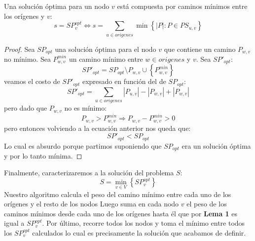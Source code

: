 \begin{lema}
\label{lema_p2}
Una solución óptima para un nodo $v$ está compuesta por caminos mínimos entre los orígenes
y $v$:
\begin{displaymath}
  s = SP_v^{opt} \Leftrightarrow s = \sum_{u \in origenes} \min \left\{ { \left\vert{P}\right\vert : P \in PS_{u, v}} \right\}
\end{displaymath}
\end{lema}
\begin{proof}
  Sea $SP_{opt}$ una solución óptima para el nodo $v$ que contiene un camino $P_{w,v}$ no mínimo. Sea $P_{w,v}^{min}$ 
un camino mínimo entre $w \in origenes$ y $v$. Sea $SP'_{opt}$:
\begin{displaymath}
SP'_{opt} = SP_{opt} \setminus P_{w, v} \cup \left\{{P_{w,v}^{min}}\right\}
\end{displaymath}
veamos el costo de $SP'_{opt}$ expresado en función del de $SP_{opt}$:
\begin{displaymath}
  SP'_{opt} = \sum_{u \in origenes} \left\vert{P_{u,v}}\right\vert - \left\vert{P_{w,v}}\right\vert + \left\vert{P_{w,v}}\right\vert
\end{displaymath}
pero dado que $P_{w,v}$ no es mínimo:
\begin{displaymath}
  P_{w,v} > P_{w,v}^{min} \Rightarrow P_{w,v} - P_{w,v}^{min} > 0
\end{displaymath}
pero entonces volviendo a la ecuación anterior nos queda que:
\begin{displaymath}
  SP'_{opt} < SP_{opt}
\end{displaymath}
Lo cual es absurdo porque partimos suponiendo que $SP_{opt}$ era un solución óptima y por lo tanto mínima.
\end{proof}

Finalmente, caracterizaremos a la solución del problema $S$:
\begin{displaymath}
  S = \min_{v \in V} \left\{ {SP_{v}^{opt}} \right\}
\end{displaymath}
Nuestro algoritmo calcula el peso del camino mínimo entre cada uno de los orígenes y el resto de los nodos \cite[p.~522]{cormen} 
Luego suma en cada nodo $v$ el peso de los caminos mínimos desde cada uno de los orígenes hasta él que por \textbf{Lema 1} es
igual a $SP_{v}^{opt}$. Por último, recorre todos los nodos y toma el mínimo entre todos los $SP_{v}^{opt}$ calculados
lo cual es precisamente la solución que acabamos de definir.

